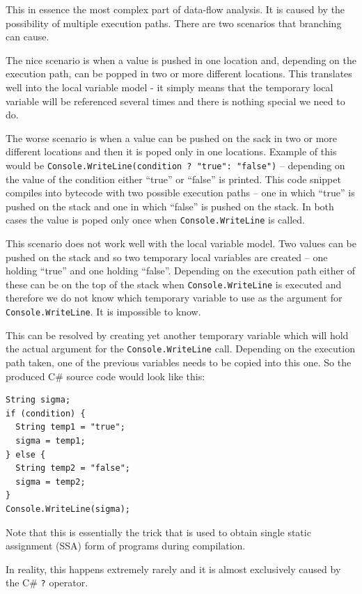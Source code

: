 \documentclass[12pt,twoside,notitlepage]{report}
\begin{document}
This in essence the most complex part of data-flow analysis.
It is caused by the possibility of multiple execution paths.
There are two scenarios that branching can cause.

The nice scenario is when a value is pushed in one location and,
depending on the execution path, can be popped in two or more different
locations.  This translates well into the local variable model -
it simply means that the temporary local variable will be referenced
several times and there is nothing special we need to do.

The worse scenario is when a value can be pushed on the sack
in two or more different locations and then it is poped only in one locations.
Example of this would be 
\verb|Console.WriteLine(condition ? "true": "false")| -- 
depending on the value of the condition either ``true'' or 
``false'' is printed.  This code snippet compiles into bytecode
with two possible execution paths -- one in which ``true'' is pushed
on the stack and one in which ``false'' is pushed on the stack.
In both cases the value is poped only once when 
\verb|Console.WriteLine| is called.

This scenario does not work well with the local variable 
model.  Two values can be pushed on the stack and so two temporary 
local variables are created --  one holding ``true'' and 
one holding ``false''.
Depending on the execution path either of these can be on the
top of the stack when \verb|Console.WriteLine| is executed and 
therefore we do not know which temporary variable to use as the argument
for \verb|Console.WriteLine|.  It is impossible to know.

This can be resolved by creating yet another temporary variable
which will hold the actual argument for the \verb|Console.WriteLine|
call.  Depending on the execution path taken, one of the previous
variables needs to be copied into this one.
So the produced C\# source code would look like this:
\begin{verbatim}
String sigma;
if (condition) {
  String temp1 = "true";
  sigma = temp1;
} else {
  String temp2 = "false";
  sigma = temp2;
}
Console.WriteLine(sigma);
\end{verbatim}

Note that this is essentially the trick that is used to obtain
single static assignment (SSA) form of programs during compilation.

In reality, this happens extremely rarely and it is almost exclusively
caused by the C\# \verb|?| operator.
\end{document}

